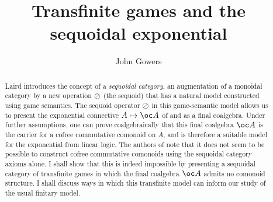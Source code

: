 \documentclass[11pt]{article}
\title{Transfinite games and the sequoidal exponential}
\author{John Gowers}
\begin{document}
\maketitle

\begin{abstract}
  Laird \cite{laird02} introduces the concept of a \emph{sequoidal category}, an augmentation of a monoidal category by a new operation $\oslash$ (the sequoid) that has a natural model constructed using game semantics.  The sequoid operator $\oslash$ in this game-semantic model allows us to present the exponential connective $A\mapsto\oc A$ of \cite{hyland1997games} and \cite{ajmPcf} as a final coalgebra.  Under further assumptions, one can prove coalgebraically that this final coalgebra $\oc A$ is the carrier for a cofree commutative comonoid on $A$, and is therefore a suitable model for the exponential from linear logic.  The authors of \cite{martinsthesis} note that it does not seem to be possible to construct cofree commutative comonoids using the sequoidal category axioms alone.  I shall show that this is indeed impossible by presenting a sequoidal category of transfinite games in which the final coalgebra $\oc A$ admits no comonoid structure.  I shall discuss ways in which this transfinite model can inform our study of the usual finitary model.
\end{abstract}



\end{document}
